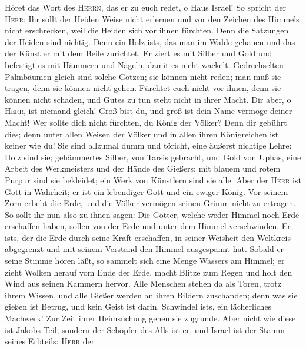  Höret das Wort des \textsc{Herrn}, das er zu euch redet,
o Haus Israel! So spricht der \textsc{Herr}:  Ihr sollt
der Heiden Weise nicht erlernen und vor den Zeichen des Himmels nicht
erschrecken, weil die Heiden sich vor ihnen fürchten. 
Denn die Satzungen der Heiden sind nichtig. Denn ein Holz
ist\textquotesingle s, das man im Walde gehauen und das der Künstler mit
dem Beile zurichtet.  Er ziert es mit Silber und Gold und
befestigt es mit Hämmern und Nägeln, damit es nicht wackelt.
 Gedrechselten Palmbäumen gleich sind solche Götzen; sie
können nicht reden; man muß sie tragen, denn sie können nicht gehen.
Fürchtet euch nicht vor ihnen, denn sie können nicht schaden, und Gutes
zu tun steht nicht in ihrer Macht.  Dir aber, o
\textsc{Herr}, ist niemand gleich! Groß bist du, und groß ist dein Name
vermöge deiner Macht!  Wer sollte dich nicht fürchten, du
König der Völker? Denn dir gebührt dies; denn unter allen Weisen der
Völker und in allen ihren Königreichen ist keiner wie du! 
Sie sind allzumal dumm und töricht, eine äußerst nichtige Lehre: Holz
sind sie;  gehämmertes Silber, von Tarsis gebracht, und
Gold von Uphas, eine Arbeit des Werkmeisters und der Hände des Gießers;
mit blauem und rotem Purpur sind sie bekleidet; ein Werk von Künstlern
sind sie alle.  Aber der \textsc{Herr} ist Gott in
Wahrheit; er ist ein lebendiger Gott und ein ewiger König. Vor seinem
Zorn erbebt die Erde, und die Völker vermögen seinen Grimm nicht zu
ertragen.  So sollt ihr nun also zu ihnen sagen: Die
Götter, welche weder Himmel noch Erde erschaffen haben, sollen von der
Erde und unter dem Himmel verschwinden.  Er
ist\textquotesingle s, der die Erde durch seine Kraft erschaffen, in
seiner Weisheit den Weltkreis abgegrenzt und mit seinem Verstand den
Himmel ausgespannt hat.  Sobald er seine Stimme hören
läßt, so sammelt sich eine Menge Wassers am Himmel; er zieht Wolken
herauf vom Ende der Erde, macht Blitze zum Regen und holt den Wind aus
seinen Kammern hervor.  Alle Menschen stehen da als
Toren, trotz ihrem Wissen, und alle Gießer werden an ihren Bildern
zuschanden; denn was sie gießen ist Betrug, und kein Geist ist darin.
 Schwindel ist\textquotesingle s, ein lächerliches
Machwerk! Zur Zeit ihrer Heimsuchung gehen sie zugrunde. 
Aber nicht wie diese ist Jakobs Teil, sondern der Schöpfer des Alls ist
er, und Israel ist der Stamm seines Erbteils: \textsc{Herr} der
